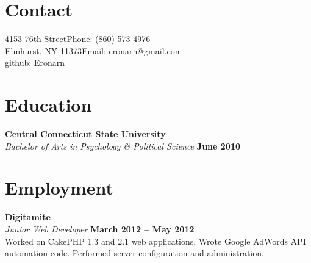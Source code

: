 \documentclass[margin,line]{resume}
\begin{document}
\begin{resume}

    \section{\mysidestyle Contact}

    4153 76th Street\hfill Phone: (860) 573-4976          \vspace{0mm}\\\vspace{0mm}%
    Elmhurst, NY 11373\hfill Email: eronarn@gmail.com  \vspace{0mm}\\\vspace{-4.5mm}%
    \hfill github: \href{https://github.com/Eronarn}{Eronarn}  \vspace{0mm}\\\vspace{-4.5mm}%
    \section{\mysidestyle Education}

    \textbf{Central Connecticut State University} \vspace{2mm}\\\vspace{1mm}%
    \textsl{Bachelor of Arts in Psychology \& Political Science} \hfill \textbf{June 2010}\vspace{-3mm}\\\vspace{-1mm}%

    \section{\mysidestyle Employment}

    \textbf{Digitamite} \vspace{2mm}\\\vspace{1mm}%
    \textsl{Junior Web Developer} \hfill \textbf{March 2012 -- May 2012}\\
    Worked on CakePHP 1.3 and 2.1 web applications. Wrote Google AdWords API automation code. Performed server configuration and administration.


\end{resume}
\end{document}
